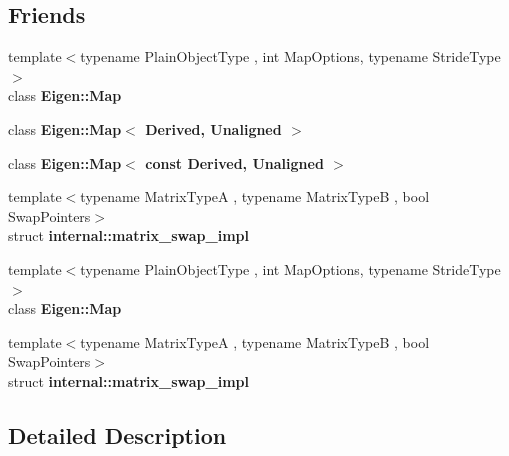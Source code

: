 \subsection*{Friends}
\begin{DoxyCompactItemize}
\item 
\mbox{\label{class_eigen_1_1_plain_object_base_a44523f8b49c90154f6195c6f04666499}} 
{\footnotesize template$<$typename Plain\+Object\+Type , int Map\+Options, typename Stride\+Type $>$ }\\class {\bfseries Eigen\+::\+Map}
\item 
\mbox{\label{class_eigen_1_1_plain_object_base_ade83ff019d359dc837c0f4b697eb5027}} 
class {\bfseries Eigen\+::\+Map$<$ Derived, Unaligned $>$}
\item 
\mbox{\label{class_eigen_1_1_plain_object_base_a52f7d6b523cce948a7804a7aeef210f9}} 
class {\bfseries Eigen\+::\+Map$<$ const Derived, Unaligned $>$}
\item 
\mbox{\label{class_eigen_1_1_plain_object_base_aab39995bda190be6874c21bc93040422}} 
{\footnotesize template$<$typename Matrix\+TypeA , typename Matrix\+TypeB , bool Swap\+Pointers$>$ }\\struct {\bfseries internal\+::matrix\+\_\+swap\+\_\+impl}
\item 
\mbox{\label{class_eigen_1_1_plain_object_base_aaf520fa49350cea3784c9dfdc32a4818}} 
{\footnotesize template$<$typename Plain\+Object\+Type , int Map\+Options, typename Stride\+Type $>$ }\\class {\bfseries Eigen\+::\+Map}
\item 
\mbox{\label{class_eigen_1_1_plain_object_base_ad8a30b599db552455f655da3388ab37f}} 
{\footnotesize template$<$typename Matrix\+TypeA , typename Matrix\+TypeB , bool Swap\+Pointers$>$ }\\struct {\bfseries internal\+::matrix\+\_\+swap\+\_\+impl}
\end{DoxyCompactItemize}


\subsection{Detailed Description}
